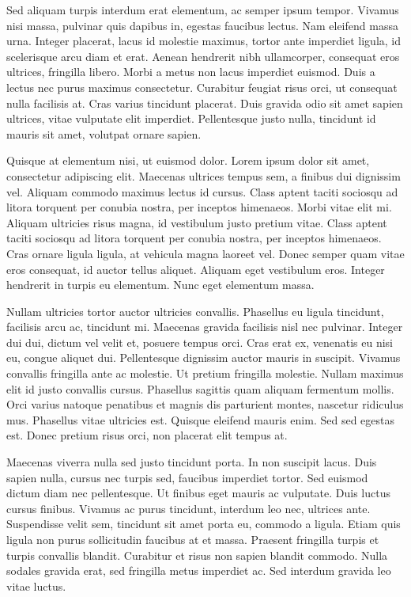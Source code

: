 \documentclass[
  english,
  man,floatsintext]{apa6}
\begin{document}
Sed aliquam turpis interdum erat elementum, ac semper ipsum tempor. Vivamus nisi massa, pulvinar quis dapibus in, egestas faucibus lectus. Nam eleifend massa urna. Integer placerat, lacus id molestie maximus, tortor ante imperdiet ligula, id scelerisque arcu diam et erat. Aenean hendrerit nibh ullamcorper, consequat eros ultrices, fringilla libero. Morbi a metus non lacus imperdiet euismod. Duis a lectus nec purus maximus consectetur. Curabitur feugiat risus orci, ut consequat nulla facilisis at. Cras varius tincidunt placerat. Duis gravida odio sit amet sapien ultrices, vitae vulputate elit imperdiet. Pellentesque justo nulla, tincidunt id mauris sit amet, volutpat ornare sapien.

Quisque at elementum nisi, ut euismod dolor. Lorem ipsum dolor sit amet, consectetur adipiscing elit. Maecenas ultrices tempus sem, a finibus dui dignissim vel. Aliquam commodo maximus lectus id cursus. Class aptent taciti sociosqu ad litora torquent per conubia nostra, per inceptos himenaeos. Morbi vitae elit mi. Aliquam ultricies risus magna, id vestibulum justo pretium vitae. Class aptent taciti sociosqu ad litora torquent per conubia nostra, per inceptos himenaeos. Cras ornare ligula ligula, at vehicula magna laoreet vel. Donec semper quam vitae eros consequat, id auctor tellus aliquet. Aliquam eget vestibulum eros. Integer hendrerit in turpis eu elementum. Nunc eget elementum massa.

Nullam ultricies tortor auctor ultricies convallis. Phasellus eu ligula tincidunt, facilisis arcu ac, tincidunt mi. Maecenas gravida facilisis nisl nec pulvinar. Integer dui dui, dictum vel velit et, posuere tempus orci. Cras erat ex, venenatis eu nisi eu, congue aliquet dui. Pellentesque dignissim auctor mauris in suscipit. Vivamus convallis fringilla ante ac molestie. Ut pretium fringilla molestie. Nullam maximus elit id justo convallis cursus. Phasellus sagittis quam aliquam fermentum mollis. Orci varius natoque penatibus et magnis dis parturient montes, nascetur ridiculus mus. Phasellus vitae ultricies est. Quisque eleifend mauris enim. Sed sed egestas est. Donec pretium risus orci, non placerat elit tempus at.

Maecenas viverra nulla sed justo tincidunt porta. In non suscipit lacus. Duis sapien nulla, cursus nec turpis sed, faucibus imperdiet tortor. Sed euismod dictum diam nec pellentesque. Ut finibus eget mauris ac vulputate. Duis luctus cursus finibus. Vivamus ac purus tincidunt, interdum leo nec, ultrices ante. Suspendisse velit sem, tincidunt sit amet porta eu, commodo a ligula. Etiam quis ligula non purus sollicitudin faucibus at et massa. Praesent fringilla turpis et turpis convallis blandit. Curabitur et risus non sapien blandit commodo. Nulla sodales gravida erat, sed fringilla metus imperdiet ac. Sed interdum gravida leo vitae luctus.
\end{document}
